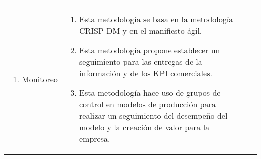 \begin{table*} [!htb]
\begin{threeparttable}
\begin{tabular}{p{1cm} p{2cm} p{5cm} p{6.5cm}}
\begin{enumerate}
				\item Monitoreo
			\end{enumerate}
			& \begin{enumerate}
				\item Esta metodología se basa en la metodología CRISP-DM y en el manifiesto ágil.
				\item Esta metodología propone establecer un seguimiento para las entregas de la información y de los KPI comerciales.
				\item Esta metodología hace uso de grupos de control en modelos de producción para realizar un seguimiento del desempeño del modelo y la creación de valor para la empresa.
			\end{enumerate}
		\end{tabular}
	\end{threeparttable}
\end{table*}


